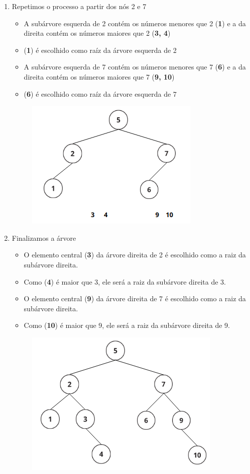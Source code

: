\begin{enumerate}
	\item Repetimos o processo a partir dos nós 2 e 7
	      \begin{itemize}
		      \item A subárvore esquerda de 2 contém os números menores que 2 (\textbf{1}) e a da direita contém os números maiores que 2 (\textbf{3, 4})
		      \item (\textbf{1}) é escolhido como raíz da árvore esquerda de 2
		      \item A subárvore esquerda de 7 contém os números menores que 7 (\textbf{6}) e a da direita contém os números maiores que 7 (\textbf{9, 10})
		      \item (\textbf{6}) é escolhido como raíz da árvore esquerda de 7
	      \end{itemize}

	      \begin{figure}[!ht]
		      \centering
		      \includegraphics[scale=0.7]{figures/binaria/passo3.png}
	      \end{figure}

	\item Finalizamos a árvore
	      \begin{itemize}
		      \item O elemento central (\textbf{3}) da árvore direita de 2 é escolhido como a raiz da subárvore direita.
		      \item Como (\textbf{4}) é maior que 3, ele será a  raiz da subárvore direita de 3.
		      \item O elemento central (\textbf{9}) da árvore direita de 7 é escolhido como a raiz da subárvore direita.
		      \item Como (\textbf{10}) é maior que 9, ele será a raiz da subárvore direita de 9.
	      \end{itemize}

	      \begin{figure}[H]
		      \centering
		      \includegraphics[scale=0.7]{figures/binaria/passo4.png}
	      \end{figure}
\end{enumerate}
